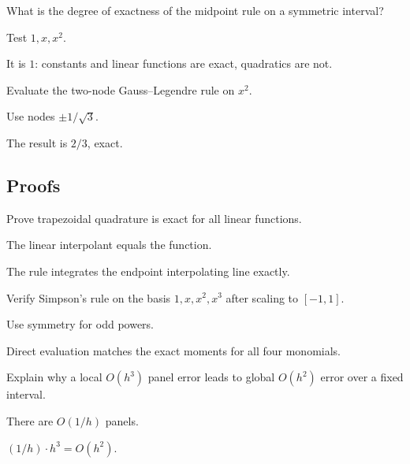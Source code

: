 \begin{exercise}\label{exr:ii24-expand-04}
What is the degree of exactness of the midpoint rule on a symmetric interval?
\end{exercise}
\begin{hint}
Test \(1,x,x^2\).
\end{hint}
\begin{solution}
It is \(1\): constants and linear functions are exact, quadratics are not.
\end{solution}

\begin{exercise}\label{exr:ii24-expand-05}
Evaluate the two-node Gauss--Legendre rule on \(x^2\).
\end{exercise}
\begin{hint}
Use nodes \(\pm1/\sqrt3\).
\end{hint}
\begin{solution}
The result is \(2/3\), exact.
\end{solution}

\subsection*{Proofs}

\begin{exercise}\label{exr:ii24-expand-06}
Prove trapezoidal quadrature is exact for all linear functions.
\end{exercise}
\begin{hint}
The linear interpolant equals the function.
\end{hint}
\begin{solution}
The rule integrates the endpoint interpolating line exactly.
\end{solution}

\begin{exercise}\label{exr:ii24-expand-07}
Verify Simpson's rule on the basis \(1,x,x^2,x^3\) after scaling to \([-1,1]\).
\end{exercise}
\begin{hint}
Use symmetry for odd powers.
\end{hint}
\begin{solution}
Direct evaluation matches the exact moments for all four monomials.
\end{solution}

\begin{exercise}\label{exr:ii24-expand-08}
Explain why a local \(O(h^3)\) panel error leads to global \(O(h^2)\) error over a fixed interval.
\end{exercise}
\begin{hint}
There are \(O(1/h)\) panels.
\end{hint}
\begin{solution}
\((1/h)\cdot h^3=O(h^2)\).
\end{solution}

